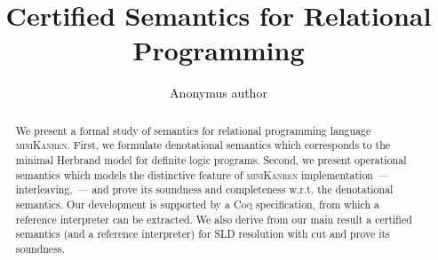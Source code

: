 \documentclass[runningheads]{llncs}
\title{Certified Semantics for Relational Programming}
\author{Anonymus author}
\institute{Anonymus institute}
\begin{document}
\maketitle

\begin{abstract}
  We present a formal study of semantics for relational programming language \textsc{miniKanren}. First,
  we formulate denotational semantics which corresponds to the minimal Herbrand model for definite logic
  programs. Second, we present operational semantics which models the distinctive feature of \textsc{miniKanren}
  implementation~--- interleaving,~--- and prove its soundness and completeness w.r.t. the denotational semantics.
  Our development is supported by a \textsc{Coq} specification, from which a reference interpreter can be
  extracted. We also derive from our main result a certified semantics (and a reference interpreter) for SLD resolution
  with cut and prove its soundness.
\end{abstract}















\end{document}
